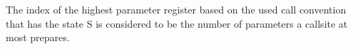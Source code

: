 %
%
%

The index of the highest parameter register based on the used call convention that has the state S is considered to be the number of parameters a callsite at most prepares.

